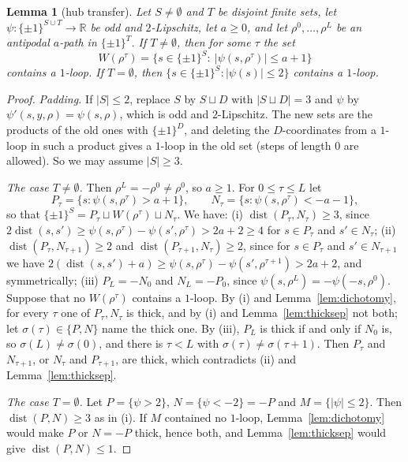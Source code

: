 \documentclass[11pt,letterpaper]{article}
\newtheorem{lemma}[theorem]{Lemma}
\theoremstyle{definition}
\newcommand{\R}{\mathbb{R}}
\newcommand{\cube}[1]{\{\pm1\}^{#1}}
\DeclareMathOperator{\dist}{dist}
\begin{document}
\begin{lemma}[hub transfer]\label{lem:hub}
Let $S\ne\emptyset$ and $T$ be disjoint finite sets, let $\psi\colon\cube{S\cup T}\to\R$ be odd and
$2$-Lipschitz, let $a\ge0$, and let $\rho^0,\dots,\rho^L$ be an antipodal $a$-path in $\cube T$.
If $T\ne\emptyset$, then for some $\tau$ the set
\[
  W(\rho^\tau)=\bigl\{s\in\cube S:\ |\psi(s,\rho^\tau)|\le a+1\bigr\}
\]
contains a $1$-loop. If $T=\emptyset$, then $\{s\in\cube S:|\psi(s)|\le2\}$ contains a $1$-loop.
\end{lemma}

\begin{proof}
\emph{Padding.} If $|S|\le2$, replace $S$ by $S\sqcup D$ with $|S\sqcup D|=3$ and $\psi$ by
$\psi'(s,y,\rho)=\psi(s,\rho)$, which is odd and $2$-Lipschitz. The new sets are the products of the
old ones with $\cube D$, and deleting the $D$-coordinates from a $1$-loop in such a product gives a
$1$-loop in the old set (steps of length $0$ are allowed). So we may assume $|S|\ge3$.

\emph{The case $T\ne\emptyset$.} Then $\rho^L=-\rho^0\ne\rho^0$, so $a\ge1$. For $0\le\tau\le L$ let
\[
  P_\tau=\{s:\psi(s,\rho^\tau)>a+1\},\qquad N_\tau=\{s:\psi(s,\rho^\tau)<-a-1\},
\]
so that $\cube S=P_\tau\sqcup W(\rho^\tau)\sqcup N_\tau$. We have:
(i) $\dist(P_\tau,N_\tau)\ge3$, since
$2\dist(s,s')\ge\psi(s,\rho^\tau)-\psi(s',\rho^\tau)>2a+2\ge4$ for $s\in P_\tau$ and $s'\in N_\tau$;
(ii) $\dist(P_\tau,N_{\tau+1})\ge2$ and $\dist(P_{\tau+1},N_\tau)\ge2$, since for $s\in P_\tau$ and
$s'\in N_{\tau+1}$ we have $2(\dist(s,s')+a)\ge\psi(s,\rho^\tau)-\psi(s',\rho^{\tau+1})>2a+2$, and
symmetrically;
(iii) $P_L=-N_0$ and $N_L=-P_0$, since $\psi(s,\rho^L)=-\psi(-s,\rho^0)$.
Suppose that no $W(\rho^\tau)$ contains a $1$-loop. By (i) and Lemma~\ref{lem:dichotomy}, for every
$\tau$ one of $P_\tau,N_\tau$ is thick, and by (i) and Lemma~\ref{lem:thicksep} not both; let
$\sigma(\tau)\in\{P,N\}$ name the thick one. By (iii), $P_L$ is thick if and only if $N_0$ is, so
$\sigma(L)\ne\sigma(0)$, and there is $\tau<L$ with $\sigma(\tau)\ne\sigma(\tau+1)$. Then $P_\tau$ and
$N_{\tau+1}$, or $N_\tau$ and $P_{\tau+1}$, are thick, which contradicts (ii) and
Lemma~\ref{lem:thicksep}.

\emph{The case $T=\emptyset$.} Let $P=\{\psi>2\}$, $N=\{\psi<-2\}=-P$ and $M=\{|\psi|\le2\}$. Then
$\dist(P,N)\ge3$ as in (i). If $M$ contained no $1$-loop, Lemma~\ref{lem:dichotomy} would make $P$ or
$N=-P$ thick, hence both, and Lemma~\ref{lem:thicksep} would give $\dist(P,N)\le1$.
\end{proof}
\end{document}
